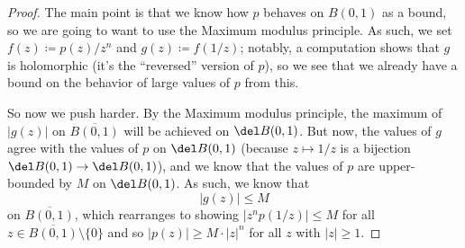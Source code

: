 \documentclass[../notes.tex]{subfiles}
\begin{document}
\begin{proof}
	The main point is that we know how $p$ behaves on $B(0,1)$ as a bound, so we are going to want to use the Maximum modulus principle. As such, we set $f(z)\coloneqq p(z)/z^n$ and $g(z)\coloneqq f(1/z)$; notably, a computation shows that $g$ is holomorphic (it's the ``reversed'' version of $p$), so we see that we already have a bound on the behavior of large values of $p$ from this.

	So now we push harder. By the Maximum modulus principle, the maximum of $|g(z)|$ on $\overline{B(0,1)}$ will be achieved on $\del B(0,1)$. But now, the values of $g$ agree with the values of $p$ on $\del B(0,1)$ (because $z\mapsto1/z$ is a bijection $\del B(0,1)\to\del B(0,1)$), and we know that the values of $p$ are upper-bounded by $M$ on $\del B(0,1)$. As such, we know that
	\[|g(z)|\le M\]
	on $\overline{B(0,1)}$, which rearranges to showing $\left|z^np(1/z)\right|\le M$ for all $z\in\overline{B(0,1)}\setminus\{0\}$ and so $|p(z)|\ge M\cdot|z|^n$ for all $z$ with $|z|\ge1$.
\end{proof}

\end{document}
